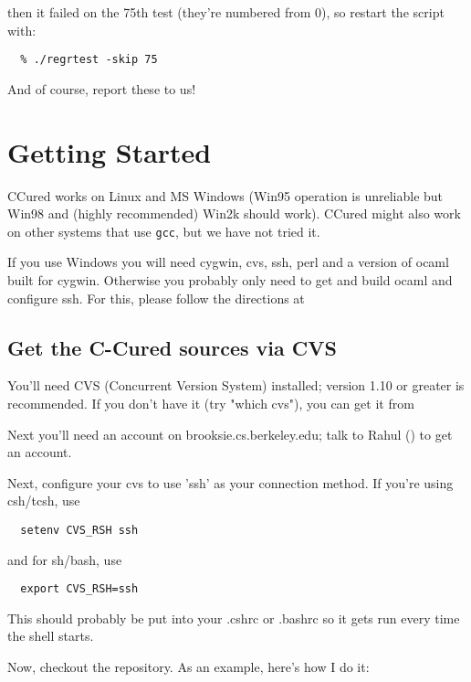 \documentclass{book}
\def\t#1{{\tt #1}}
\begin{document}
then it failed on the 75th test (they're numbered from 0), so restart
the script with:

\begin{verbatim}
  % ./regrtest -skip 75
\end{verbatim}

And of course, report these to us!

        \chapter{Getting Started}\label{ch-start}

 CCured works on Linux and MS Windows (Win95 operation is unreliable but Win98
and (highly recommended) Win2k should work). CCured might also work on other
systems that use \t{gcc}, but we have not tried it.

 If you use Windows you will need cygwin, cvs, ssh, perl and a version of
ocaml built for cygwin. Otherwise you probably only need to get and build
ocaml and configure ssh. For this, please follow the directions at


\section{Get the C-Cured sources via CVS}

You'll need CVS (Concurrent Version System) installed; version 1.10 or
greater is recommended.  If you don't have it (try "which cvs"), you can
get it from


Next you'll need an account on brooksie.cs.berkeley.edu; talk to Rahul
() to get an account.

Next, configure your cvs to use 'ssh' as your connection method.  If you're
using csh/tcsh, use

\begin{verbatim}
  setenv CVS_RSH ssh
\end{verbatim}

  
and for sh/bash, use

\begin{verbatim}
  export CVS_RSH=ssh
\end{verbatim}

This should probably be put into your .cshrc or .bashrc so it gets run
every time the shell starts.

Now, checkout the repository.  As an example, here's how I do it:
\end{document}

